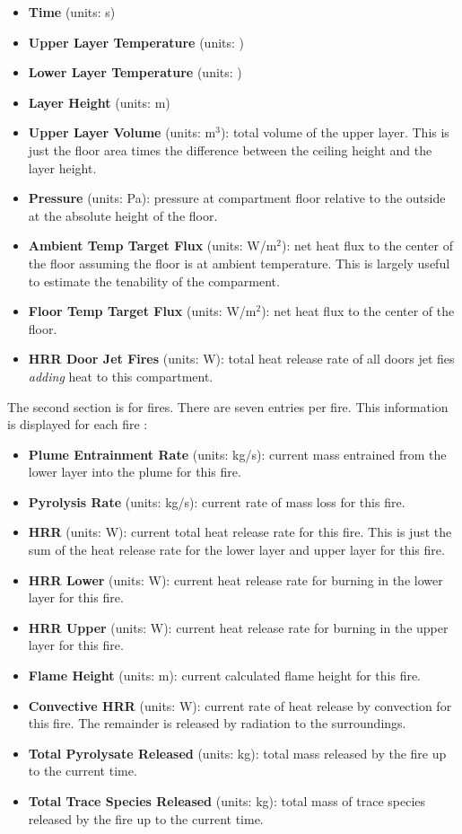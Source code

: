 \begin{itemize}
\item \textbf{Time} (units: s)
\item \textbf{Upper Layer Temperature} (units: \degc)
\item \textbf{Lower Layer Temperature} (units: \degc)
\item \textbf{Layer Height}  (units: m)
\item\textbf{ Upper Layer Volume} (units: m$^3$): total volume of the upper layer. This is just the floor area times the difference between the ceiling height and the layer height.
\item\textbf{ Pressure} (units: Pa): pressure at compartment floor relative to the outside at the absolute height of the floor.
\item \textbf{Ambient Temp Target Flux} (units: W/m$^2$): net heat flux to the center of the floor assuming the floor is at ambient temperature.  This is largely useful to estimate the tenability of the comparment.
\item \textbf{Floor Temp Target Flux} (units: W/m$^2$): net heat flux to the center of the floor.
\item \textbf{HRR Door Jet Fires} (units: W): total heat release rate of all doors jet fies \emph{adding} heat to this compartment.
\end{itemize}

The second section is for fires. There are seven entries per fire.  This information is displayed for each fire :

\begin{itemize}
\item \textbf{Plume Entrainment Rate} (units: kg/s): current mass entrained from the lower layer into the plume for this fire.
\item \textbf{Pyrolysis Rate} (units: kg/s): current rate of mass loss for this fire.
\item \textbf{HRR} (units: W): current total heat release rate for this fire. This is just the sum of the heat release rate for the lower layer and upper layer for this fire.
\item \textbf{HRR Lower} (units: W): current heat release rate for burning in the lower layer for this fire.
\item \textbf{HRR Upper} (units: W):  current heat release rate for burning in the upper layer for this fire.
\item \textbf{Flame Height} (units: m): current calculated flame height for this fire.
\item \textbf{Convective HRR} (units: W): current rate of heat release by convection for this fire.  The remainder is released by radiation to the surroundings.
\item \textbf{Total Pyrolysate Released} (units: kg): total mass released by the fire up to the current time.
\item \textbf{Total Trace Species Released} (units: kg): total mass of trace species released by the fire up to the current time.
\end{itemize}

